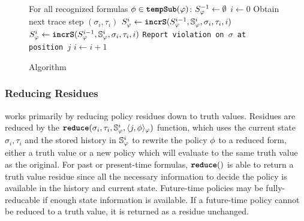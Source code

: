 \begin{figure}
\begin{algorithmic}[1]
\STATE For all recognized formulas $\policyv \in \tempSub(\policy)$: $\histst[\policy_1]{-1} \leftarrow \emptyset$
\STATE $i \leftarrow 0$
\LOOP
\STATE Obtain next trace step $(\sigma_i, \tau_i)$ 
	\STATE $\histst[\policyv]{i} \leftarrow \incrS(\histst[\policyv]{i-1}, \histSt[\policyv]{i}, \sigma_i, \tau_i, i)$
\ENDFOR
\STATE $\histst{i} \leftarrow \incrS(\histst{i-1}, \histSt{i}, \sigma_i, \tau_i, i)$
\STATE \texttt{Report violation on $\sigma$ at position $j$}
\ENDFOR
\STATE $i \leftarrow i + 1$
\ENDLOOP
\end{algorithmic}
\caption{\monitor Algorithm}\label{fig:algorithm}
\end{figure}

\subsubsection{Reducing Residues}
\monitor works primarily by reducing policy residues down to truth values. Residues are reduced by the $\reduce(\sigma_i, \tau_i, \histSt{i}, \rpt{j}{\policyv}{\policy})$ function, which uses the current state $\sigma_i,\tau_i$ and the stored history in $\histSt{i}$ to rewrite the policy $\policyv$ to a reduced form, either a truth value or a new policy which will evaluate to the same truth value as the original. For past or present-time formulas, $\reduce()$ is able to return a truth value residue since all the necessary information to decide the policy is available in the history and current state. Future-time policies may be fully-reducable if enough state information is available. If a future-time policy cannot be reduced to a truth value, it is returned as a residue unchanged.

